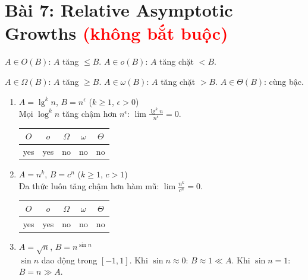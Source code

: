 \documentclass[12pt,a4paper]{article}
\begin{document}
\newpage
\section{Bài 7: Relative Asymptotic Growths {\small\textcolor{red}{(không bắt buộc)}}}

\begin{notebox}
$A \in O(B)$: $A$ tăng $\leq B$. \quad $A \in o(B)$: $A$ tăng chặt $< B$.

$A \in \Omega(B)$: $A$ tăng $\geq B$. \quad $A \in \omega(B)$: $A$ tăng chặt $> B$. \quad $A \in \Theta(B)$: cùng bậc.
\end{notebox}

\begin{enumerate}[label=\textbf{\alph*.}]

  \item $A = \lg^k n$, $B = n^\epsilon$ ($k \geq 1$, $\epsilon > 0$) \\[4pt]
  Mọi $\log^k n$ tăng chậm hơn $n^\epsilon$: $\lim \frac{\lg^k n}{n^\epsilon} = 0$.

  \begin{center}
  \begin{tabular}{|c|c|c|c|c|}
  \hline $O$ & $o$ & $\Omega$ & $\omega$ & $\Theta$ \\ \hline
  yes & yes & no & no & no \\ \hline
  \end{tabular}
  \end{center}

  \item $A = n^k$, $B = c^n$ ($k \geq 1$, $c > 1$) \\[4pt]
  Đa thức luôn tăng chậm hơn hàm mũ: $\lim \frac{n^k}{c^n} = 0$.

  \begin{center}
  \begin{tabular}{|c|c|c|c|c|}
  \hline $O$ & $o$ & $\Omega$ & $\omega$ & $\Theta$ \\ \hline
  yes & yes & no & no & no \\ \hline
  \end{tabular}
  \end{center}

  \item $A = \sqrt{n}$, $B = n^{\sin n}$ \\[4pt]
  $\sin n$ dao động trong $[-1,1]$. Khi $\sin n \approx 0$: $B \approx 1 \ll A$. Khi $\sin n = 1$: $B = n \gg A$.


\end{enumerate}
\end{document}
